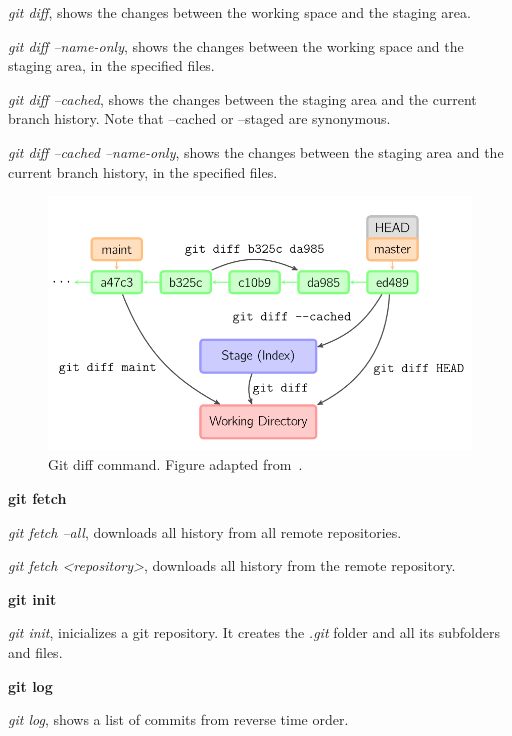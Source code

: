 \begin{refsection}
\noindent \emph{git diff}, shows the changes between the working space and the staging area.

\noindent \emph{git diff --name-only}, shows the changes between the working space and the staging area, in the specified files.

\noindent \emph{git diff --cached}, shows the changes between the staging area and the current branch history. Note that --cached or --staged are synonymous.

\noindent \emph{git diff --cached --name-only}, shows the changes between the staging area and the current branch history, in the specified files.

\begin{figure}[H]
  \centering
  \includegraphics[width=12cm]{./chapter/git/figures/git_diff.png}
  \caption{Git diff command. Figure adapted from~\cite{Lodato19}.}\label{git_diff_command}
\end{figure}

\vspace*{5mm} \noindent \textbf{git fetch}

\noindent\emph{git fetch --all}, downloads all history from all remote repositories.

\noindent\emph{git fetch <repository>}, downloads all history from the remote repository.

\vspace*{5mm} \noindent \textbf{git init}

\noindent\emph{git init}, inicializes a git repository. It creates the \emph{.git} folder and all its subfolders and files.

\vspace*{5mm} \noindent \textbf{git log}

\noindent\emph{git log}, shows a list of commits from reverse time order.


\end{refsection}

